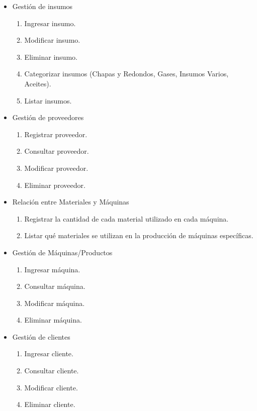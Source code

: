 \documentclass{article}
\begin{document}
\begin{itemize}
	\item Gestión de insumos
	\begin{enumerate}
		\item Ingresar insumo.
		\item Modificar insumo.
		\item Eliminar insumo.
		\item Categorizar insumos (Chapas y Redondos, Gases, Insumos Varios, Aceites).
		\item Listar insumos.
	\end{enumerate}
\end{itemize}

\begin{itemize}
	\item Gestión de proveedores
	\begin{enumerate}[start=6]
		\item Registrar proveedor.
		\item Consultar proveedor.
		\item Modificar proveedor.
		\item Eliminar proveedor.
	\end{enumerate}
\end{itemize}

\begin{itemize}
	\item Relación entre Materiales y Máquinas
	\begin{enumerate}[start=10]
		\item Registrar la cantidad de cada material utilizado en cada máquina.
		\item Listar qué materiales se utilizan en la producción de máquinas específicas.
	\end{enumerate}
\end{itemize}

\begin{itemize}
	\item Gestión de Máquinas/Productos
	\begin{enumerate}[start=12]
		\item Ingresar máquina.
		\item Consultar máquina.
		\item Modificar máquina.
		\item Eliminar máquina.
	\end{enumerate}
\end{itemize}

\begin{itemize}
	\item Gestión de clientes
	\begin{enumerate}[start=16]
		\item Ingresar cliente.
		\item Consultar cliente.
		\item Modificar cliente.
		\item Eliminar cliente.
	\end{enumerate}
\end{itemize}
\end{document}
